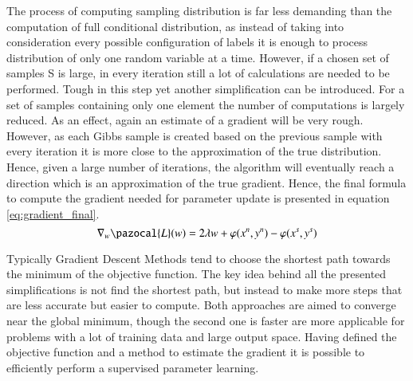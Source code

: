 The process of computing sampling distribution is far less demanding than the computation of full conditional distribution, as instead of taking into consideration every possible configuration of labels it is enough to process distribution of only one random variable at a time. However, if a chosen set of samples S is large, in every iteration still a lot of calculations are needed to be performed. Tough in this step yet another simplification can be introduced. For a set of samples containing only one element the number of computations is largely reduced. As an effect, again an estimate of a gradient will be very rough. However, as each Gibbs sample is created based on the previous sample with every iteration it is more close to the approximation of the true distribution. Hence, given a large number of iterations, the algorithm will eventually reach a direction which is an approximation of the true gradient. Hence, the final formula to compute the gradient needed for parameter update is presented in equation \ref{eq:gradient_final}. 
\begin{equation}
    \label{eq:gradient_final}
    \nabla_w\pazocal{L}(w) = 2\lambda w + \varphi(x^n,y^n) -\varphi(x^s,y^s)
\end{equation}

Typically Gradient Descent Methods tend to choose the shortest path towards the minimum of the objective function. The key idea behind all the presented simplifications is not find the shortest path, but instead to make more steps that are less accurate but easier to compute. Both approaches are aimed to converge near the global minimum, though the second one is faster are more applicable for problems with a lot of training data and large output space. Having defined the objective function and a method to estimate the gradient it is possible to efficiently perform a supervised parameter learning. 
